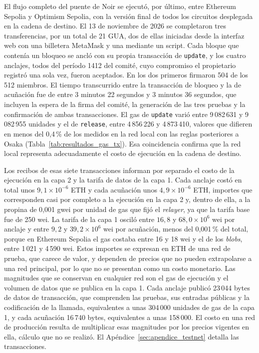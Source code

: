 El flujo completo del puente de Noir se ejecutó, por último, entre Ethereum Sepolia y Optimism
Sepolia, con la versión final de todos los circuitos desplegada en la cadena de destino. El
13 de noviembre de 2026 se completaron tres transferencias, por un total de 21 GUA, dos de ellas
iniciadas desde la interfaz web con una billetera MetaMask y una mediante un script. Cada bloque
que contenía un bloqueo se ancló con su propia transacción de \lstinline|update|, y los cuatro
anclajes, todos del período 1412 del comité, cuyo compromiso el propietario registró una sola vez,
fueron aceptados. En los dos primeros firmaron 504 de los 512 miembros. El tiempo transcurrido
entre la transacción de bloqueo y la de acuñación fue de entre 3 minutos 22 segundos y 3 minutos
36 segundos, que incluyen la espera de la firma del comité, la generación de las tres pruebas y
la confirmación de ambas transacciones. El gas de \lstinline|update| varió entre 9\,082\,631 y
9\,082\,955 unidades y el de \lstinline|release|, entre 4\,856\,226 y 4\,873\,410, valores que
difieren en menos del 0,4\,\% de los medidos en la red local con las reglas posteriores a Osaka
(Tabla~\ref{tab:resultados_gas_tx}). Esa coincidencia confirma que la red local representa
adecuadamente el costo de ejecución en la cadena de destino.

Los recibos de esas siete transacciones informan por separado el costo de la ejecución en la capa 2
y la tarifa de datos de la capa 1. Cada anclaje costó en total unos $9{,}1 \times 10^{-6}$ ETH y
cada acuñación unos $4{,}9 \times 10^{-6}$ ETH, importes que corresponden casi por completo a la
ejecución en la capa 2 y, dentro de ella, a la propina de 0,001 gwei por unidad de gas que fijó el
\textit{relayer}, ya que la tarifa base fue de 250 wei. La tarifa de la capa 1 osciló entre
$16{,}8$ y $68{,}0 \times 10^{6}$ wei por anclaje y entre $9{,}2$ y $39{,}2 \times 10^{6}$ wei
por acuñación, menos del 0,001\,\% del total, porque en Ethereum Sepolia el gas costaba entre 16 y
18 wei y el de los \textit{blobs}, entre 1\,021 y 4\,590 wei. Estos importes se expresan en ETH de
una red de prueba, que carece de valor, y dependen de precios que no pueden extrapolarse a una red
principal, por lo que no se presentan como un costo monetario. Las magnitudes que se conservan en
cualquier red son el gas de ejecución y el volumen de datos que se publica en la capa 1. Cada
anclaje publicó 23\,044 bytes de datos de transacción, que comprenden las pruebas, sus entradas
públicas y la codificación de la llamada, equivalentes a unas 304\,000 unidades de gas de la capa 1,
y cada acuñación 16\,740 bytes, equivalentes a unas 158\,000. El costo en una red de producción
resulta de multiplicar esas magnitudes por los precios vigentes en ella, cálculo que no se realizó.
El Apéndice~\ref{sec:apendice_testnet} detalla las transacciones.

